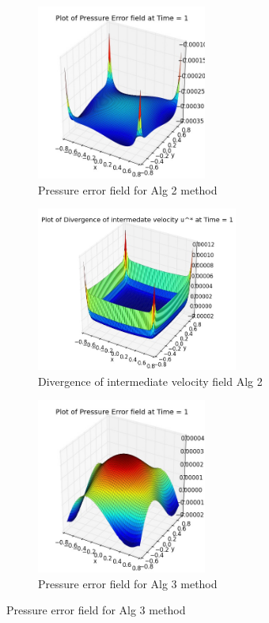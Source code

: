 \begin{figure}[H]
	\centering
	\begin{subfigure}[t]{2.2in}
		\centering
		\includegraphics[width=2.2in]{figures/Pm1b_unf1_np_P_error_t_1_grid_60.jpg}
		\caption{Pressure error field for Alg 2 method}\label{fig:6.15a}		
	\end{subfigure}
	\quad
	\begin{subfigure}[t]{2.6in}
		\centering
		\includegraphics[width=2.6in]{figures/Pm1b_unf1_np_div_uvstar_t_1_grid_60.jpg}
		\caption{Divergence of intermediate velocity field Alg 2}\label{fig:6.15b}
	\end{subfigure}
	\quad
	\centering
	\begin{subfigure}[t]{2.2in}
		\centering
		\includegraphics[width=2.2in]{figures/Pm2_unf1_np_P_error_t_1_grid_60.jpg}
		\caption{Pressure error field for Alg 3 method}\label{fig:6.15c}		
	\end{subfigure}

\end{figure}
